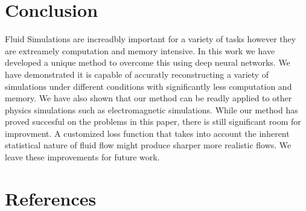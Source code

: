 \documentclass{article}
\begin{document}
\section{Conclusion}

Fluid Simulations are increadbly important for a variety of tasks however they are extreamely computation and memory intensive. In this work we have developed a unique method to overcome this using deep neural networks. We have demonstrated it is capable of accuratly reconstructing a variety of simulations under different conditions with significantly less computation and memory. We have also shown that our method can be readly applied to other physics simulations such as electromagnetic simulations. While our method has proved succesful on the problems in this paper, there is still significant room for improvment. A customized loss function that takes into account the inherent statistical nature of fluid flow might produce sharper more realistic flows. We leave these improvements for future work.

\section*{References}



\end{document}
